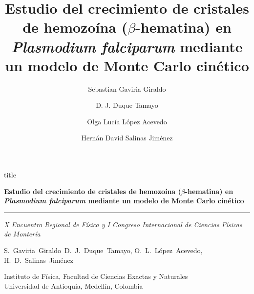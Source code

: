\documentclass[aspectratio=169,11pt]{beamer}
\title[kMC para hemozoína]{Estudio del crecimiento de cristales de hemozoína
  ($\beta$-hematina) en \textit{Plasmodium falciparum} mediante un modelo de
  Monte Carlo cinético}
\author{Sebastian Gaviria Giraldo \and D. J. Duque Tamayo \and Olga Lucía López Acevedo \and Hernán David Salinas Jiménez}
\institute{Instituto de Física, Universidad de Antioquia}
\begin{document}
\begin{frame}[plain]
  \vfill
  \begin{beamercolorbox}[wd=\textwidth,sep=1em,center,rounded=true,shadow=false]{title}
    {\Large\bfseries Estudio del crecimiento de cristales de hemozoína ($\beta$-hematina) en \textit{Plasmodium falciparum} mediante un modelo de Monte Carlo cinético\\[0.2em] \par}
    \vspace{0.5em}
    {\color{white!60!azul}\rule{0.45\linewidth}{0.4pt}\par}
    \vspace{0.35em}
    {\normalsize\itshape X Encuentro Regional de Física y I Congreso Internacional de Ciencias Físicas de Montería\\[0.2em] \par}
  \end{beamercolorbox}
  \vspace{1.2em}
  \centering
  {\large S.~Gaviria~Giraldo\, D.~J.~Duque~Tamayo,\; O.~L.~López~Acevedo,\; H.~D.~Salinas~Jiménez\par}
  \vspace{0.2em}
  \vspace{0.5em}
  {\small\color{gris}Instituto de Física, Facultad de Ciencias Exactas y Naturales\\
   Universidad de Antioquia, Medellín, Colombia\par}
  \vspace{0.7em}
  \par
  \vfill
\end{frame}
\end{document}
